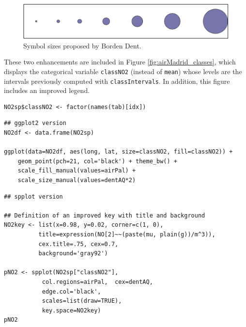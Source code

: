 \begin{figure}[htb]
\centering
\includegraphics[width=.9\linewidth]{figs/dent.pdf}
\caption{\label{fig:dent}Symbol sizes proposed by Borden Dent.}
\end{figure}

These two enhancements are included in Figure
\ref{fig:airMadrid_classes}, which displays the categorical variable
\texttt{classNO2} (instead of \texttt{mean}) whose levels are the intervals
previously computed with \texttt{classIntervals}. In addition, this
figure includes an improved legend.

\lstset{language=R,numbers=none}
\begin{lstlisting}
NO2sp$classNO2 <- factor(names(tab)[idx])
\end{lstlisting}

\lstset{language=R,numbers=none}
\begin{lstlisting}
## ggplot2 version
NO2df <- data.frame(NO2sp)

ggplot(data=NO2df, aes(long, lat, size=classNO2, fill=classNO2)) +
    geom_point(pch=21, col='black') + theme_bw() +
    scale_fill_manual(values=airPal) +
    scale_size_manual(values=dentAQ*2)
\end{lstlisting}

\lstset{language=R,numbers=none}
\begin{lstlisting}
## spplot version

## Definition of an improved key with title and background
NO2key <- list(x=0.98, y=0.02, corner=c(1, 0),
	      title=expression(NO[2]~~(paste(mu, plain(g))/m^3)),
	      cex.title=.75, cex=0.7,
	      background='gray92')

pNO2 <- spplot(NO2sp["classNO2"],
	       col.regions=airPal,  cex=dentAQ,
	       edge.col='black',
	       scales=list(draw=TRUE),
	       key.space=NO2key)
pNO2
\end{lstlisting}

